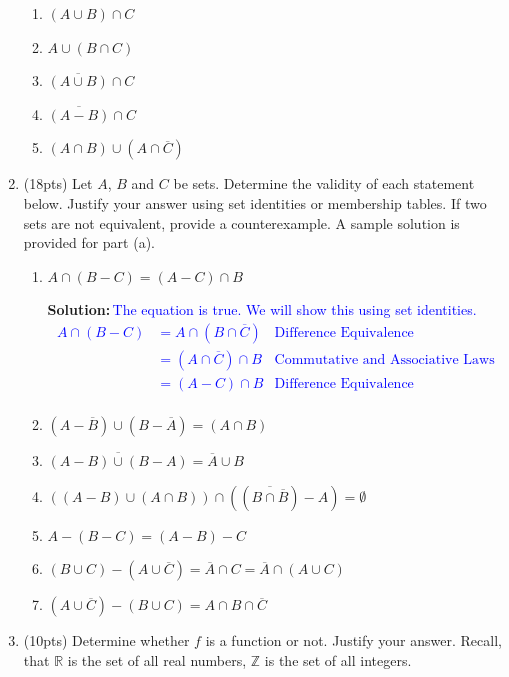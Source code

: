 \documentclass{article}
\newcommand{\ov}[1]{\overline{#1}}
\newcommand{\sol}[1]{\textbf{Solution:\,}\textcolor{blue}{#1}}
\begin{document}
\begin{enumerate}
\begin{enumerate} 
\item $(A\cup B) \cap C$ 
\item $A\cup (B \cap C)$ 
\item $\overline{(A \cup B)} \cap C$ 
\item $\overline{(A - B)} \cap C$
\item $(A \cap B) \cup (A \cap \overline{C})$
\end{enumerate}




\item(18pts) Let $A$, $B$ and $C$ be sets. Determine the validity of each statement below. Justify your answer using set identities or membership tables. If two sets are not equivalent, provide a counterexample. A sample solution is provided for part (a).
\begin{enumerate}
\item $A \cap (B-C) = (A-C) \cap B$

\sol{The equation is true. We will show this using set identities. 
\begin{align*}
A \cap (B-C)
 &= A \cap (B \cap \overline{C}) & \text{Difference Equivalence}\\
 &= (A \cap \overline{C}) \cap B & \text{Commutative and Associative Laws}\\
 &= (A - C) \cap B & \text{Difference Equivalence} \\
 \end{align*} 
}

\item $(A-\overline{B}) \cup (B-\overline{A}) = (A \cap B)$ 
\item $\overline{(A-B) \cup (B-A)} = \overline{A}\cup B$
\item $((A - B)\cup(A \cap B))\cap((\ov{B\cap \ov{B}}) - A)= \emptyset$
\item $A-(B-C) = (A-B)-C$
\item $(B \cup C)-(A \cup \ov{C}) = \ov{A} \cap C = \ov{A} \cap (A \cup C)$
\item $(A \cup \ov{C})- (B \cup C) = A \cap B \cap \ov{C}$

\end{enumerate}




\item(10pts) Determine whether $f$ is a function or not. Justify your answer. Recall, that $\mathbb{R}$ is the set of all real numbers, $\mathbb{Z}$ is the set of all integers. 


\end{enumerate}
\end{document}

